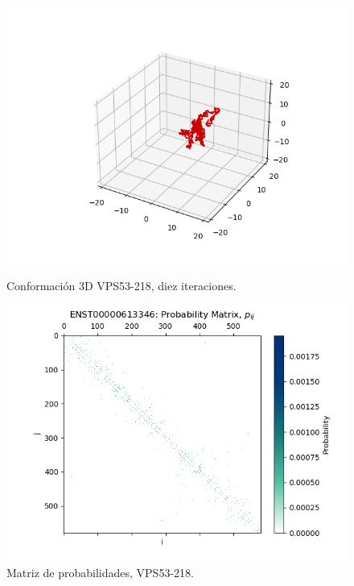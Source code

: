 \documentclass[a4paper,11pt,titlepage]{article}
\theoremstyle{definition}
\begin{document}
\begin{figure}[H]
    \centering
    \begin{minipage}[c]{0.45\textwidth}
        \centering
        \includegraphics[width=\textwidth]{images/VPS53-218-db_iter.png}
        \caption{Conformación 3D VPS53-218, diez iteraciones.}
        \label{fig:VPS53-218-multi}
    \end{minipage}
    \hfill
    \begin{minipage}[c]{0.45\textwidth}
        \centering
        \includegraphics[width=\textwidth]{images/VPS53-218-db_iter-matrix.png}
        \caption{Matriz de probabilidades, VPS53-218.}
        \label{fig:VPS53-218-matrix}
    \end{minipage}
\end{figure}
\end{document}
